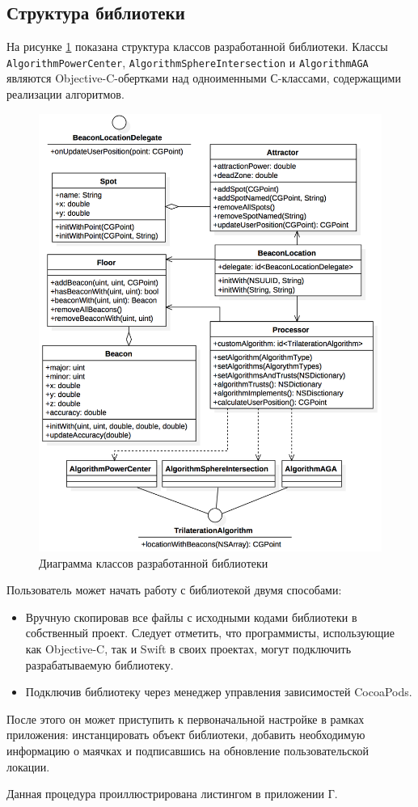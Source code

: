 \subsection{Структура библиотеки}

На рисунке \ref{fig:uml} показана структура классов разработанной библиотеки. Классы \texttt{AlgorithmPowerCenter}, \texttt{AlgorithmSphereIntersection} и \texttt{Algo\-rithm\-AGA} являются Objective-C-обертками над одноименными С-классами, содержащими реализации алгоритмов.

\begin{figure}[ht]
    \centering
    \includegraphics[scale=0.7]{img/uml2}
    \caption{Диаграмма классов разработанной библиотеки}
    \label{fig:uml}
\end{figure}

Пользователь может начать работу с библиотекой двумя способами:
\begin{itemize}
    \item
    Вручную скопировав все файлы с исходными кодами библиотеки в собственный проект. Следует отметить, что программисты, использующие как Objective-C, так и Swift в своих проектах, могут подключить разрабатываемую библиотеку.
    \item
    Подключив библиотеку через менеджер управления зависимостей Co\-coa\-Pods.
\end{itemize}

После этого он может приступить к первоначальной настройке в рамках приложения: инстанцировать объект библиотеки, добавить необходимую информацию о маячках и подписавшись на обновление пользовательской локации.

Данная процедура проиллюстрирована листингом в приложении Г.